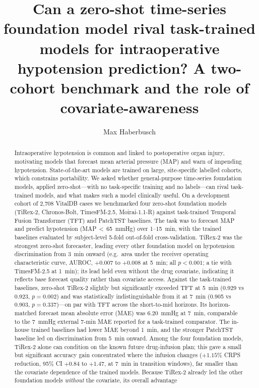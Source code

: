 \documentclass[11pt]{article}
\title{\textbf{Can a zero-shot time-series foundation model rival
task-trained models for intraoperative hypotension prediction? A two-cohort
benchmark and the role of covariate-awareness}}
\author[1,2]{Max Haberbusch}
\affil[1]{Center for Medical Physics and Biomedical Engineering, Medical University of Vienna, Vienna, Austria}
\affil[2]{Ludwig Boltzmann Institute for Cardiovascular Research, Vienna, Austria}
\affil[ ]{\normalfont Correspondence: \texttt{max.haberbusch@meduniwien.ac.at}}
\date{}
\begin{document}
\maketitle

\begin{abstract}
\noindent
Intraoperative hypotension is common and linked to postoperative organ
injury, motivating models that forecast mean arterial pressure (MAP) and
warn of impending hypotension. State-of-the-art models are trained on
large, site-specific labelled cohorts, which constrains portability. We
asked whether general-purpose time-series foundation models, applied
zero-shot---with no task-specific training and no labels---can rival
task-trained models, and what makes such a model clinically useful. On a
development cohort of 2{,}708 VitalDB cases we benchmarked four zero-shot
foundation models (TiRex-2, Chronos-Bolt, TimesFM-2.5, Moirai-1.1-R)
against task-trained Temporal Fusion Transformer (TFT) and PatchTST
baselines. The task was to forecast MAP and predict hypotension
(MAP\,$<$\,65~mmHg) over 1--15~min, with the trained baselines evaluated by
subject-level 5-fold out-of-fold cross-validation. TiRex-2 was the strongest zero-shot forecaster, leading every
other foundation model on hypotension discrimination from 3~min onward
(e.g.\ area under the receiver operating characteristic curve, AUROC,
$+0.007$ to $+0.008$ at 5~min; all $p<0.001$; a tie with TimesFM-2.5 at
1~min); its lead held
even without the drug covariate, indicating it reflects base forecast
quality rather than covariate access. Against the task-trained baselines,
zero-shot TiRex-2 slightly but significantly exceeded TFT at 5~min (0.929 vs
0.923, $p=0.002$) and was statistically indistinguishable from it at 7~min
(0.905 vs 0.903, $p=0.337$)---on par with TFT across the short-to-mid
horizons. Its horizon-matched forecast mean absolute error (MAE) was 6.20~mmHg
at 7~min, comparable to the 7~mmHg external 7-min MAE reported for a
task-trained comparator. The in-house trained baselines had lower MAE
beyond 1~min, and the stronger PatchTST baseline led on discrimination from
5~min onward. Among the
four foundation models, TiRex-2 alone can condition on the known future
drug-infusion plan; this gave a small but significant accuracy gain
concentrated where the infusion changes ($+1.15\%$ CRPS reduction, 95\% CI
$+0.84$ to $+1.47$, at 7~min in transition windows), far smaller than the
covariate dependence of the trained models. Because TiRex-2 already led the
other foundation models \emph{without} the covariate, its overall advantage

\end{abstract}
\end{document}
